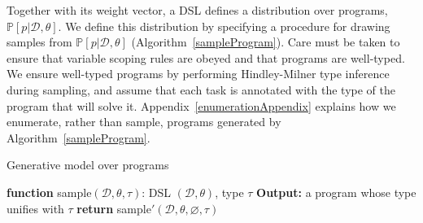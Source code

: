 \documentclass{article}
\newcommand{\probability}{\mathds{P}} %
\begin{document}
Together with its weight vector, a DSL defines a distribution over
programs, $\probability[p|\mathcal{D},\theta]$.  We define this
distribution by specifying a procedure for drawing samples from
$\probability[p|\mathcal{D},\theta]$ (Algorithm~\ref{sampleProgram}).
Care must be taken to ensure that variable scoping rules are obeyed
and that programs are well-typed.  We ensure well-typed programs by
performing Hindley-Milner type inference~\cite{pierce} during
sampling, and assume that each task is annotated with the type of the
program that will solve it.
Appendix~\ref{enumerationAppendix}
explains how we enumerate,
rather than sample,
programs generated by Algorithm~\ref{sampleProgram}.
 \begin{algorithm}
   \caption{Generative model over programs}
   \label{sampleProgram}
   \begin{algorithmic}[1]
     \State \textbf{function} sample$(\mathcal{D}, \theta, \tau)$:
      DSL $(\mathcal{D},\theta)$, type $\tau$
     \State \textbf{Output:} a program whose type unifies with $\tau$
     \State  \textbf{return }sample$'(\mathcal{D}, \theta, \varnothing, \tau)$


\end{algorithmic}
\end{algorithm}
\end{document}
